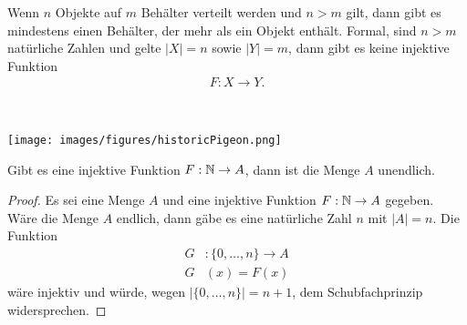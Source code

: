 \begin{lm}[Schubfachprinzip]
    Wenn $n$ Objekte auf $m$ Behälter verteilt werden und $n>m$ gilt, dann gibt es mindestens einen Behälter, der mehr als ein Objekt enthält. Formal, sind $n>m$ natürliche Zahlen und gelte $|X|= n$ sowie $|Y|=m$, dann gibt es keine injektive Funktion
    \begin{align*}
    F: X\to Y.
    \end{align*}
\end{lm}

\begin{ueb}~

    \texttt{[image: images/figures/historicPigeon.png]}
\end{ueb}
\begin{lsg}
\end{lsg}

\begin{lm}\label{injEndl}
    Gibt es eine injektive Funktion $F:\mathbb{N}\to A$, dann ist die Menge $A$ unendlich.
\end{lm}
\begin{proof}
    Es sei eine Menge $A$ und eine injektive Funktion $F:\mathbb{N}\to A$ gegeben. Wäre die Menge $A$ endlich, dann gäbe es eine natürliche Zahl $n$ mit $|A|=n$. Die Funktion
    \begin{align*}
    G&:\{0,\dots,n\}\to A\\
    G&(x) = F(x)
    \end{align*}
    wäre injektiv und würde, wegen $|\{0,\dots,n\}|=n+1$, dem Schubfachprinzip widersprechen.
\end{proof}

